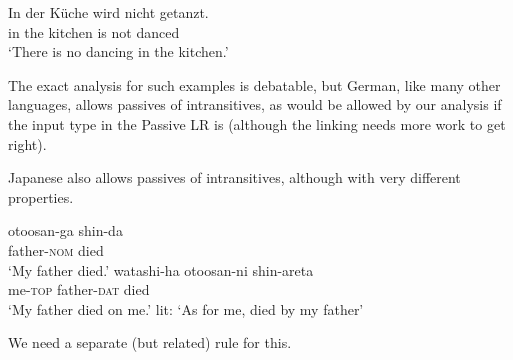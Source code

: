 \documentclass[a4paper,landscape,headrule,footrule]{foils}
\begin{document}

\begin{exe}
\ex \gll In der Küche  wird nicht getanzt. \\
in the kitchen   is     not   danced \\
\trans ‘There is no dancing in the kitchen.’
\end{exe}

The exact analysis for such examples is debatable, but German, like
many other languages, allows passives of intransitives, as would be
allowed by our analysis if the input type in the Passive LR is
 (although the linking needs more work to get right).


Japanese also allows passives of intransitives, although with very
different properties.

\begin{exe}
\ex \gll otoosan-ga shin-da  \\
         father-\textsc{nom} died \\
\trans ‘My father died.’
\ex \gll watashi-ha otoosan-ni shin-areta  \\
         me-\textsc{top} father-\textsc{dat} died \\
\trans `My father died on me.' lit: `As for me, died by my father'
\end{exe}

We need a separate (but related) rule for this.


\end{document}
